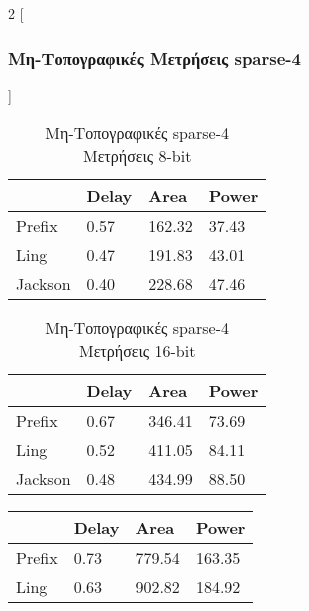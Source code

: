 \begin{multicols}{2}
[\subsubsection{Μη-Τοπογραφικές Μετρήσεις sparse-4}]
\begin{table}[H]
\centering
     \begin{tabular}{||p{1.2cm} | p{0.7cm}  p{1cm}  p{1cm} ||} 
        \hline
         & Delay & Area & Power \\ [0.5ex] 
        \hline\hline
        Prefix  & 0.57  & 162.32    & 37.43 \\ 
        \hline
        Ling    & 0.47  & 191.83    & 43.01 \\
        \hline
        Jackson & 0.40  & 228.68    & 47.46 \\
        \hline
    \end{tabular}
\caption{Μη-Τοπογραφικές sparse-4 Μετρήσεις 8-bit}
\label{topo_sparse4_result_table_8}
\end{table}
\begin{table}[H]
\centering
     \begin{tabular}{||p{1.2cm} | p{0.7cm} p{1cm} p{1cm} ||} 
        \hline
        & Delay & Area & Power \\ [0.5ex] 
        \hline\hline
        Prefix  & 0.67  & 346.41    & 73.69 \\ 
        \hline
        Ling    & 0.52  & 411.05    & 84.11 \\
        \hline
        Jackson & 0.48  & 434.99    & 88.50 \\
        \hline
    \end{tabular}
\caption{Μη-Τοπογραφικές sparse-4 Μετρήσεις 16-bit}
\label{topo_sparse4_result_table_16}
\end{table}
\begin{table}[H]
\centering
     \begin{tabular}{||p{1.2cm} | p{0.7cm} p{1cm} p{1cm} ||} 
        \hline
        & Delay & Area & Power \\ [0.5ex] 
        \hline\hline
        Prefix  & 0.73  & 779.54    & 163.35 \\ 
        \hline
        Ling    & 0.63  & 902.82    & 184.92 \\
        \hline

\end{tabular}
\end{table}
\end{multicols}
